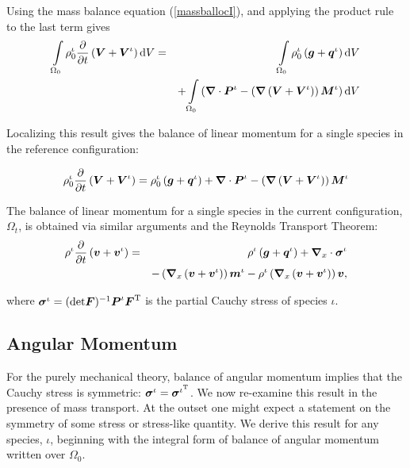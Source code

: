 \noindent Using the mass balance equation (\ref{massballocI}), and
applying the product rule to the last term gives
\begin{eqnarray}
\int\limits_{\Omega_0} \rho_0^\iota\frac{\partial}{\partial
t}\left(\mbox{\boldmath$ V$}+\mbox{\boldmath$ V$}^\iota\right) \mathrm{d}V &=&
\int\limits_{\Omega_0}\rho^\iota_0\left(\mbox{\boldmath$ g$}+\mbox{\boldmath$ q$}^\iota\right)\mathrm{d}V\nonumber\\
& &+
\int\limits_{\Omega_0}\left(\mbox{\boldmath$\nabla$}\cdot\mbox{\boldmath$ P$}^\iota-\left(\mbox{\boldmath$\nabla$}\left(\mbox{\boldmath$ V$}+\mbox{\boldmath$ V$}^\iota\right)\right)\mbox{\boldmath$ M$}^\iota\right)\mathrm{d}V
\end{eqnarray}

\noindent Localizing this result gives the balance of linear
momentum for a single species in the reference configuration:

\begin{equation}
\rho_0^\iota\frac{\partial}{\partial t}\left(\mbox{\boldmath$ V$}+\mbox{\boldmath$ V$}^\iota\right)
= \rho^\iota_0\left(\mbox{\boldmath$ g$}+\mbox{\boldmath$ q$}^\iota\right) +
\mbox{\boldmath$\nabla$}\cdot\mbox{\boldmath$ P$}^\iota-\left(\mbox{\boldmath$\nabla$}\left(\mbox{\boldmath$ V$}+\mbox{\boldmath$ V$}^\iota\right)\right)\mbox{\boldmath$ M$}^\iota
\label{ballinmomrefI}
\end{equation}

The balance of linear momentum for a single species in the current
configuration, $\Omega_t$, is obtained via similar arguments and
the Reynolds Transport Theorem:
\begin{eqnarray}
\rho^\iota\frac{\partial}{\partial t}\left(\mbox{\boldmath$ v$}+\mbox{\boldmath$ v$}^\iota\right)
&=& \rho^\iota\left(\mbox{\boldmath$ g$}+\mbox{\boldmath$ q$}^\iota\right) +
\mbox{\boldmath$\nabla$}_x\cdot\mbox{\boldmath$\sigma$}^\iota\nonumber\\
& & - \left(\mbox{\boldmath$\nabla$}_x\left(\mbox{\boldmath$ v$}+\mbox{\boldmath$ v$}^\iota\right)\right)\mbox{\boldmath$ m$}^\iota -
\rho^\iota\left(\mbox{\boldmath$\nabla$}_x\left(\mbox{\boldmath$ v$}+\mbox{\boldmath$ v$}^\iota\right)\right)\mbox{\boldmath$ v$},
\label{ballinmomcurrI}
\end{eqnarray}

\noindent where $\mbox{\boldmath$\sigma$}^\iota =
(\mathrm{det}\mbox{\boldmath$ F$})^{-1}\mbox{\boldmath$ P$}^\iota\mbox{\boldmath$ F$}^\mathrm{T}$ is the partial
Cauchy stress of species $\iota$.


\subsection{Angular Momentum}
\label{sect3.2} For the purely mechanical theory, balance of
angular momentum implies that the Cauchy stress is symmetric:
$\mbox{\boldmath$\sigma$}^\iota = \mbox{\boldmath$\sigma$}^{\iota^\mathrm{T}}$. We now re-examine
this result in the presence of mass transport. At the outset one
might expect a statement on the symmetry of some stress or
stress-like quantity. We derive this result for any species,
$\iota$, beginning with the integral form of balance of angular
momentum written over $\Omega_0$.

